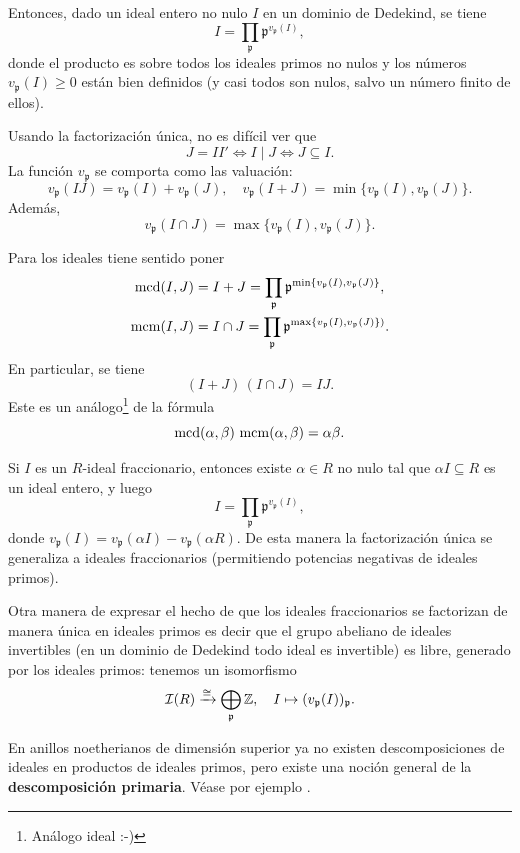 Entonces, dado un ideal entero no nulo $I$ en un dominio de Dedekind, se tiene
$$I = \prod_{\mathfrak{p}} \mathfrak{p}^{v_{\mathfrak{p}} (I)},$$
donde el producto es sobre todos los ideales primos no nulos y los números
$v_{\mathfrak{p}} (I) \ge 0$ están bien definidos (y casi todos son nulos, salvo
un número finito de ellos).

Usando la factorización única, no es difícil ver que
$$J = I I' \iff I \mid J \iff J \subseteq I.$$
La función $v_{\mathfrak{p}}$ se comporta como las
valuación:
\[ v_{\mathfrak{p}} (IJ) = v_{\mathfrak{p}} (I) + v_{\mathfrak{p}} (J), \quad
   v_{\mathfrak{p}} (I+J) = \min \{ v_{\mathfrak{p}} (I), v_{\mathfrak{p}} (J) \}. \]
Además,
$$v_{\mathfrak{p}} (I\cap J) = \max \{ v_{\mathfrak{p}} (I), v_{\mathfrak{p}} (J) \}.$$

Para los ideales tiene sentido poner
\begin{align*}
\operatorname{mcd} (I,J) & = I + J = \prod_\mathfrak{p} \mathfrak{p}^{\min \{v_\mathfrak{p} (I), v_\mathfrak{p} (J)\}},\\
\operatorname{mcm} (I,J) & = I\cap J = \prod_\mathfrak{p} \mathfrak{p}^{\max \{v_\mathfrak{p} (I), v_\mathfrak{p} (J)\})}.
\end{align*}
En particular, se tiene
$$(I + J)\,(I\cap J) = IJ.$$
Este es un análogo\footnote{Análogo ideal :-)} de la fórmula
$$\operatorname{mcd} (\alpha,\beta)\,\operatorname{mcm} (\alpha,\beta) = \alpha\beta.$$

Si $I$ es un $R$-ideal fraccionario, entonces existe $\alpha \in R$ no nulo
tal que $\alpha I \subseteq R$ es un ideal entero, y luego
$$I = \prod_{\mathfrak{p}} \mathfrak{p}^{v_{\mathfrak{p}} (I)},$$
donde $v_{\mathfrak{p}} (I) = v_{\mathfrak{p}} (\alpha I) - v_{\mathfrak{p}} (\alpha R)$.
De esta manera la factorización única se generaliza a ideales fraccionarios
(permitiendo potencias negativas de ideales primos).

Otra manera de expresar el hecho de que los ideales fraccionarios se factorizan
de manera única en ideales primos es decir que el grupo abeliano de ideales
invertibles (en un dominio de Dedekind todo ideal es invertible) es libre,
generado por los ideales primos: tenemos un isomorfismo
\[ \mathcal{I} (R) \xrightarrow{\cong} \bigoplus_{\mathfrak{p}} \mathbb{Z}, \quad
   I \mapsto (v_{\mathfrak{p}} (I))_\mathfrak{p}. \]

\begin{comentario}
  En anillos noetherianos de dimensión superior ya no existen descomposiciones
  de ideales en productos de ideales primos, pero existe una noción general
  de la \textbf{descomposición primaria}. Véase por ejemplo
  \cite[Chapter 4, 6]{Atiyah-Macdonald}.
\end{comentario}

